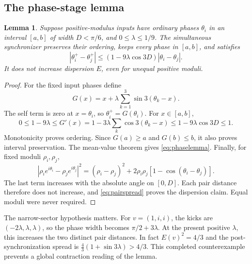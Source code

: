 \documentclass[11pt,a4paper]{article}
\numberwithin{equation}{section}
\newtheorem{lemma}[theorem]{Lemma}
\theoremstyle{remark}\newtheorem{remark}[theorem]{Remark}
\begin{document}
\subsection{The phase-stage lemma}
\begin{lemma}\label{lem:phase}
Suppose positive-modulus inputs have ordinary phases $\theta_i$ in an interval $[a,b]$ of width $D<\pi/6$, and $0\le\lambda\le1/9$. The simultaneous synchronizer preserves their ordering, keeps every phase in $[a,b]$, and satisfies
\begin{equation}
|\theta_i^+-\theta_j^+|\le(1-9\lambda\cos3D)|\theta_i-\theta_j|.
\label{eq:phaselemma}
\end{equation}
It does not increase dispersion $E$, even for unequal positive moduli.
\end{lemma}
\begin{proof}
For the fixed input phases define
\[
G(x)=x+\lambda\sum_{k=1}^3\sin3(\theta_k-x).
\]
The self term is zero at $x=\theta_i$, so $\theta_i^+=G(\theta_i)$. For $x\in[a,b]$,
\begin{equation}
0\le1-9\lambda\le G'(x)
=1-3\lambda\sum_k\cos3(\theta_k-x)
\le1-9\lambda\cos3D\le1.
\end{equation}
Monotonicity proves ordering. Since $G(a)\ge a$ and $G(b)\le b$, it also proves interval preservation. The mean-value theorem gives \eqref{eq:phaselemma}. Finally, for fixed moduli $\rho_i,\rho_j$,
\[
|\rho_i e^{i\theta_i}-\rho_j e^{i\theta_j}|^2
=(\rho_i-\rho_j)^2+2\rho_i\rho_j[1-\cos(\theta_i-\theta_j)].
\]
The last term increases with the absolute angle on $[0,D]$. Each pair distance therefore does not increase, and \eqref{eq:pairspread} proves the dispersion claim. Equal moduli were never required.
\end{proof}

The narrow-sector hypothesis matters. For $v=(1,i,i)$, the kicks are $(-2\lambda,\lambda,\lambda)$, so the phase width becomes $\pi/2+3\lambda$. At the present positive $\lambda$, this increases the two distinct pair distances. In fact $E(v)^2=4/3$ and the post-synchronization spread is $\frac43(1+\sin3\lambda)>4/3$. This completed counterexample prevents a global contraction reading of the lemma.
\end{document}

